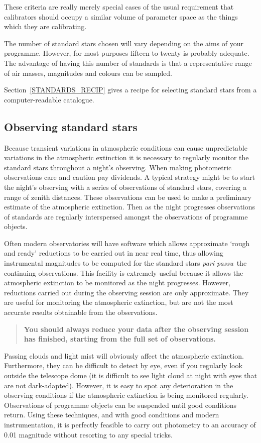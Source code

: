 \documentclass[twoside,11pt]{article}
\begin{document}
These criteria are really merely special cases of the usual requirement
that calibrators should occupy a similar volume of parameter space as
the things which they are calibrating.

The number of standard stars chosen will vary depending on the aims of
your programme.  However, for most purposes fifteen to twenty is
probably adequate.  The advantage of having this number of standards
is that a representative range of air masses, magnitudes and colours
can be sampled.

Section~\ref{STANDARDS_RECIP} gives a recipe for selecting standard
stars from a computer-readable catalogue.

\subsection{Observing standard stars}

Because transient variations in atmospheric conditions can cause
unpredictable variations in the atmospheric extinction it is necessary
to regularly monitor the standard stars throughout a night's observing.
When making photometric observations care and caution pay dividends.  A
typical strategy might be to start the night's observing with a series
of observations of standard stars, covering a range of zenith distances.
These observations can be used to make a preliminary estimate of the
atmospheric extinction.  Then as the night progresses observations of
standards are regularly interspersed amongst the observations of
programme objects.

Often modern observatories will have software which allows approximate
`rough and ready' reductions to be carried out in near real time, thus
allowing instrumental magnitudes to be computed for the standard stars
{\it pari passu}\, the continuing observations.  This facility is extremely
useful because it allows the atmospheric extinction to be monitored as the
night progresses.  However, reductions carried out during the observing
session are only approximate.  They are useful for monitoring the
atmospheric extinction, but are not the most accurate results
obtainable from the observations.

\begin{quote}
{\bf You should always reduce your data after the observing session
has finished, starting from the full set of observations.}
\end{quote}

Passing clouds and light mist will obviously affect the atmospheric
extinction.  Furthermore, they can be difficult to detect by eye, even
if you regularly look outside the telescope dome (it is difficult to see
light cloud at night with eyes that are not dark-adapted).  However, it
is easy to spot any deterioration in the observing conditions if the
atmospheric extinction is being monitored regularly.  Observations of
programme objects can be suspended until good conditions return.  Using
these techniques, and with good conditions and modern instrumentation,
it is perfectly feasible to carry out photometry to an accuracy of 0.01
magnitude without resorting to any special tricks.
\end{document}
